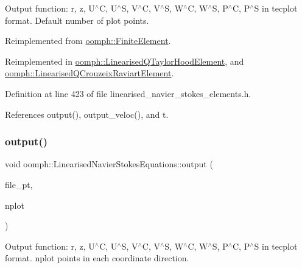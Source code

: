 Output function\+: r, z, U$^\wedge$C, U$^\wedge$S, V$^\wedge$C, V$^\wedge$S, W$^\wedge$C, W$^\wedge$S, P$^\wedge$C, P$^\wedge$S in tecplot format. Default number of plot points. 



Reimplemented from \hyperlink{classoomph_1_1FiniteElement_a72cddd09f8ddbee1a20a1ff404c6943e}{oomph\+::\+Finite\+Element}.



Reimplemented in \hyperlink{classoomph_1_1LinearisedQTaylorHoodElement_a93a43aa55672d50f4fde9b0f088c95ab}{oomph\+::\+Linearised\+Q\+Taylor\+Hood\+Element}, and \hyperlink{classoomph_1_1LinearisedQCrouzeixRaviartElement_a3654e347b8eeb08452d67fe19d351cc8}{oomph\+::\+Linearised\+Q\+Crouzeix\+Raviart\+Element}.



Definition at line 423 of file linearised\+\_\+navier\+\_\+stokes\+\_\+elements.\+h.



References output(), output\+\_\+veloc(), and t.

\mbox{\label{classoomph_1_1LinearisedNavierStokesEquations_a526bc349330e22ae332c75d0b9fd75df}} 
\subsubsection{\texorpdfstring{output()}{output()}\hspace{0.1cm}{\footnotesize\ttfamily [4/4]}}
{\footnotesize\ttfamily void oomph\+::\+Linearised\+Navier\+Stokes\+Equations\+::output (\begin{DoxyParamCaption}\item[{F\+I\+LE $\ast$}]{file\+\_\+pt,  }\item[{const unsigned \&}]{nplot }\end{DoxyParamCaption})\hspace{0.3cm}{\ttfamily [virtual]}}



Output function\+: r, z, U$^\wedge$C, U$^\wedge$S, V$^\wedge$C, V$^\wedge$S, W$^\wedge$C, W$^\wedge$S, P$^\wedge$C, P$^\wedge$S in tecplot format. nplot points in each coordinate direction. 

